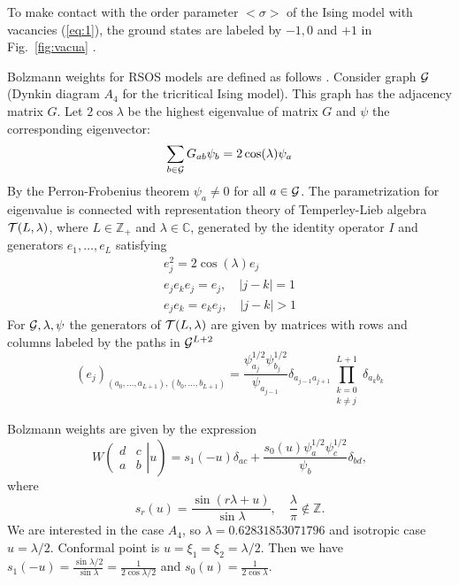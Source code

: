 \documentclass[12pt]{article}
\begin{document}
To make contact with the order parameter $<\sigma>$ of the Ising model
with vacancies (\ref{eq:1}),  the ground states are labeled by $-1, 0$
and $+1$ in Fig.~\ref{fig:vacua} \cite{chim1996boundary}.

Bolzmann weights for RSOS models are defined as follows \cite{behrend2001integrable}. Consider
graph ${\cal G}$ (Dynkin diagram $A_4$ for the tricritical Ising
model). This graph has the adjacency matrix $G$. Let $2\cos\lambda$ be the
highest eigenvalue of matrix $G$ and $\psi$ the corresponding eigenvector:
\begin{equation}
  \label{eq:2}
  \sum_{b\in {\cal G}} G_{ab}\psi_b = 2\cos(\lambda) \psi_a
\end{equation}
By the Perron-Frobenius theorem $\psi_a \neq 0$ for all $a\in {\cal
  G}$. 
The parametrization for eigenvalue is connected with
representation theory of Temperley-Lieb algebra ${\cal T}(L,\lambda)$,
where $L\in \mathbb{Z}_+$ and $\lambda\in\mathbb{C}$, generated by the
identity operator $I$ and generators $e_1,\dots, e_L$ satisfying
\begin{equation}
  \label{eq:3}
  \begin{array}{l}
    e_j^2 = 2\cos(\lambda) e_j\\
    e_j e_k e_j = e_j, \quad |j-k|=1\\
    e_j e_k = e_k e_j , \quad |j-k|>1
  \end{array}
\end{equation}
For ${\cal G}, \lambda, \psi$ the generators of ${\cal T}(L,\lambda)$
are given by matrices with rows and columns labeled by the paths in ${\cal G}^{L+2}$
\begin{equation}
  \label{eq:4}
  \left(e_j\right)_{(a_0,\dots, a_{L+1}),(b_0,\dots,
    b_{L+1})}=\frac{\psi^{1/2}_{a_j} \psi^{1/2}_{b_j}}{\psi_{a_{j-1}}}
  \delta_{a_{j-1} a_{j+1}} \prod_{\substack{k=0\\k\neq j}}^{L+1}\delta_{a_k b_k}
\end{equation}

Bolzmann weights are given by the expression
\begin{equation}
  \label{eq:5}
  W\left.\left(
    \begin{array}{cc}
      d & c\\
      a & b
    \end{array}\right| u \right)
= s_1 (-u)\delta_{ac} + \frac{s_0 (u) \psi_a^{1/2}
  \psi_c^{1/2}}{\psi_b} \delta_{bd},
\end{equation}
where
  \begin{equation}
    \label{eq:6}
    s_r(u)=\frac{\sin(r\lambda+u)}{\sin\lambda},\quad \frac{\lambda}{\pi}\not\in\mathbb{Z}.
  \end{equation}
We are interested in the case $A_4$, so $\lambda=0.62831853071796$ and
isotropic case $u=\lambda/2$. Conformal point is
$u=\xi_1=\xi_2=\lambda/2$. Then we have
$s_1(-u)=\frac{\sin\lambda/2}{\sin\lambda}=\frac{1}{2\cos\lambda/2}$ and $s_0(u)=\frac{1}{2\cos\lambda}$.
\end{document}
